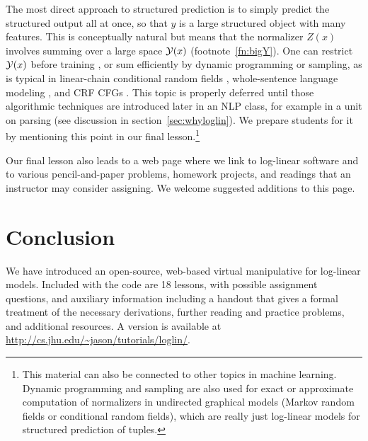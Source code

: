 \documentclass[11pt,letterpaper]{article}
\newcommand{\Note}[1]{}
\renewcommand{\Note}[1]{\hl{[#1]}}  %
\newcommand{\NoteSigned}[3]{{\sethlcolor{#2}\Note{#1: #3}}}
\newcommand{\NoteFF}[1]{\NoteSigned{FF}{LightBlue}{#1}}
\newcommand{\WhereToFind}[0]{\url{http://cs.jhu.edu/~jason/tutorials/loglin/}}
\newcommand{\NumLessons}[0]{18}%
\begin{document}
The most direct approach to structured prediction is to simply predict
the structured output all at once, so that $y$ is a large structured
object with many features.  This is conceptually natural but means
that the normalizer $Z(x)$ involves summing over a large space ${\cal
  Y}(x)$ (footnote~\ref{fn:bigY}).  One can restrict ${\cal Y}(x)$
before training \cite{johnson-et-al-1999}, or sum efficiently by
dynamic programming or sampling, as is typical in linear-chain
conditional random fields \cite{lafferty-mccallum-pereira-2001},
whole-sentence language modeling \cite{rosenfeld-chen-zhu-2001}, and
CRF CFGs \cite{finkel2008efficient}.  This topic is properly deferred
until those algorithmic techniques are introduced later in an NLP
class, for example in a unit on parsing (see discussion in
section~\ref{sec:whyloglin}).  We prepare students for it by
mentioning this point in our final lesson.\footnote{This material can
  also be connected to other topics in machine learning.  Dynamic
  programming and sampling are also used for exact or approximate
  computation of normalizers in undirected graphical models (Markov
  random fields or conditional random fields), which are really just
  log-linear models for structured prediction of tuples.}



Our final lesson also leads to a web page where we link to log-linear
software and to various pencil-and-paper problems, homework projects,
and readings that an instructor may consider assigning.  We welcome
suggested additions to this page.


\section{Conclusion}
We have introduced an open-source, web-based virtual manipulative for
log-linear models. Included with the code are
\NumLessons{} lessons, with possible assignment questions, and auxiliary 
information including a handout that gives a formal treatment of the necessary 
derivations, further reading and practice problems, and additional resources.
A version is available at \WhereToFind{}.
\end{document}

